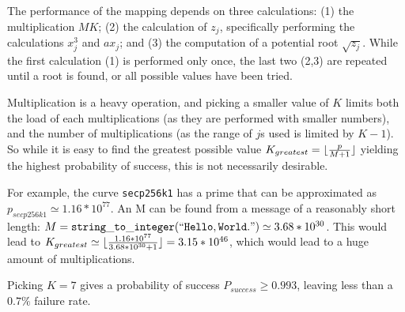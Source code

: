 The performance of the mapping depends on three calculations: (1) the multiplication \(MK\); (2) the calculation of \(z_j\), specifically
performing the calculations \(x_j^3\) and \(ax_j\); and (3) the computation of a potential root \(\sqrt{z_j}\). While the first calculation (1)
is performed only once, the last two (2,3) are repeated until a root is found, or all possible values have been tried.

Multiplication is a heavy operation, and picking a smaller value of \(K\) limits both the load of each multiplications (as they are performed with
smaller numbers), and the number of multiplications (as the range of \(j\)s used is limited by \(K - 1\)). So while it is easy to find the greatest
possible value \(K_{greatest} = {\lfloor { p \over {M + 1} }\rfloor}\) yielding the highest probability of success, this is not necessarily desirable.

For example, the curve \verb+secp256k1+ has a prime that can be approximated as \(p_{secp256k1} \simeq 1.16*10^{77}\).\cite{safecurves} An M can be
found from a message of a reasonably short length: \(M = \mathtt{string\_to\_integer(``Hello, World.")} \simeq 3.68*10^{30}\). This would lead to
\(K_{greatest} \simeq {\lfloor { {1.16*10^{77}} \over {3.68*10^{30} + 1}} \rfloor} = 3.15*10^{46}\), which would lead to a huge amount of multiplications.

Picking \(K = 7\) gives a probability of success \(P_{success} \geq 0.993\), leaving less than a \(0.7\%\) failure rate.